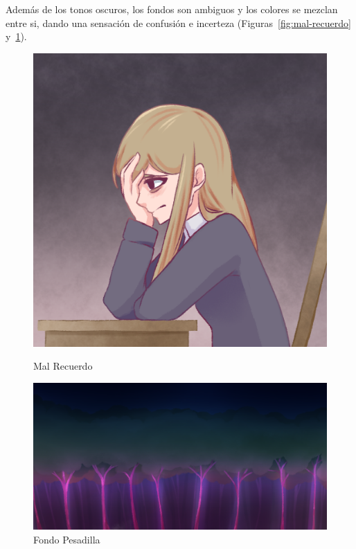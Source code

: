 Además de los tonos oscuros, los fondos son ambiguos y los colores se mezclan entre si, dando una sensación de confusión e incerteza (Figuras~\ref{fig:mal-recuerdo} y~\ref{fig:fondo-pesadilla}).
\begin{figure}[ht]
    \centering
    \begin{minipage}{.34\textwidth}
        \includegraphics[width=.95\textwidth]{imgs/Memory1.png}
        \caption{Mal Recuerdo}
        \label{fig:mal-recuerdo}
    \end{minipage}
    \begin{minipage}{.65\textwidth}
        \includegraphics[width=\textwidth]{imgs/bg_pesadilla.png}
        \caption{Fondo Pesadilla}
        \label{fig:fondo-pesadilla}
    \end{minipage}
\end{figure}

